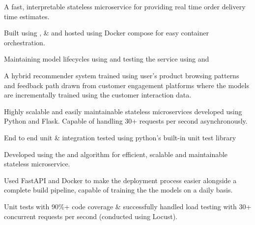 \documentclass[]{deedy-resume-openfont}
\begin{document}
\begin{tightemize}
\item A fast, interpretable stateless microservice for providing real time order delivery time estimates.
\item Built using ,  \&  and hosted using Docker compose for easy container orchestration.
\item Maintaining model lifecycles using  and testing the service using  and 
\end{tightemize}

\sectionsep

\vspace{\topsep}


\textbullet{}  \textbullet{}  \textbullet{}  \textbullet{}  

\begin{tightemize}
\item A hybrid recommender system trained using user's product browsing patterns and feedback path drawn from customer engagement platforms where the models are incrementally trained using the customer interaction data.
\item Highly scalable and easily maintainable stateless microservices developed using Python and Flask. Capable of handling 30+ requests per second asynchronously.
\item End to end unit \& integration tested using python's built-in unit test library
\end{tightemize}


 \textbullet{}  \textbullet{}  \textbullet{}  \textbullet{} 

\begin{tightemize}
\item Developed using the  and  algorithm for efficient, scalable and maintainable stateless microservice.
\item Used FastAPI and Docker to make the deployment process easier alongside a complete build pipeline, capable of training the the models on a daily basis.
\item Unit tests with 90\%+ code coverage \& successfully handled load testing with 30+ concurrent requests per second (conducted using Locust).
\end{tightemize}
\end{document}
